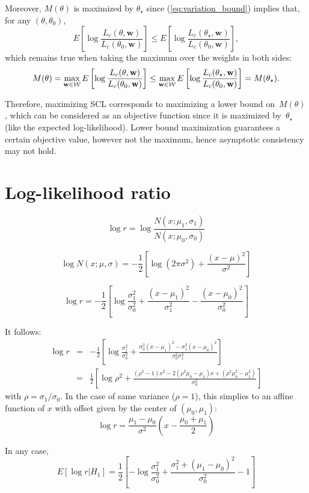 \documentclass[english]{scrartcl}
\begin{document}
Moreover, $M(\theta)$ is maximized by $\theta_\star$ since (\ref{eq:variation_bound}) implies that, for any $(\theta,\theta_0)$,
$$
E\left[ \log \frac{L_c(\theta, \mathbf{w})}{L_c(\theta_0, \mathbf{w})} \right]
\leq
E\left[ \log \frac{L_c(\theta_\star, \mathbf{w})}{L_c(\theta_0, \mathbf{w})} \right],
$$
which remains true when taking the maximum over the weights in both sides: 
$$
M(\theta) = 
\max_{\mathbf{w}\in{\cal W}} E\left[ \log \frac{L_c(\theta, \mathbf{w})}{L_c(\theta_0, \mathbf{w})} \right]
\leq
\max_{\mathbf{w}\in{\cal W}} E\left[ \log \frac{L_c(\theta_\star, \mathbf{w})}{L_c(\theta_0, \mathbf{w})} \right]
= M(\theta_\star)
.
$$

Therefore, maximizing SCL corresponds to maximizing a lower bound on~$M(\theta)$, which can be considered as an objective function since it is maximized by~$\theta_\star$ (like the expected log-likelihood). Lower bound maximization guarantees a certain objective value, however not the maximum, hence asymptotic consistency may not hold.

\section{Log-likelihood ratio}

$$
\log r = \log \frac{N(x;\mu_1,\sigma_1)}{N(x;\mu_0,\sigma_0)}
$$

$$
\log N(x;\mu,\sigma) = -\frac{1}{2}\left[
\log(2\pi\sigma^2) + \frac{(x-\mu)^2}{\sigma^2}
\right]
$$

$$
\log r = -\frac{1}{2}
\left[
\log \frac{\sigma_1^2}{\sigma_0^2}
+ \frac{(x-\mu_1)^2}{\sigma_1^2} - \frac{(x-\mu_0)^2}{\sigma_0^2}
\right]
$$

It follows:
\begin{eqnarray*}
\log r 
 & = & 
-\frac{1}{2}\left[
\log \frac{\sigma_1^2}{\sigma_0^2}
+ \frac{\sigma_0^2(x-\mu_1)^2 - \sigma_1^2(x-\mu_0)^2}{\sigma_0^2 \sigma_1^2}
\right] \\
 & = & 
\frac{1}{2}\left[
\log \rho^2
+ \frac{(\rho^2-1)x^2 - 2(\rho^2\mu_0-\mu_1)x+ (\rho^2\mu_0 ^2-\mu_1^2)}{\sigma_0^2}
\right]
\end{eqnarray*}
with $\rho=\sigma_1/\sigma_0$. In the case of same variance ($\rho=1$), this simplies to an affine function of $x$ with offset given by the center of $(\mu_0,\mu_1)$:
$$
\log r = \frac{\mu_1-\mu_0}{\sigma^2} \left(
x - \frac{\mu_0 + \mu_1}{2}
\right) 
$$

In any case,
$$
E[\log r | H_1] = 
\frac{1}{2}
\left[
- \log \frac{\sigma_1^2}{\sigma_0^2}
+ \frac{\sigma_1^2 + (\mu_1-\mu_0)^2}{\sigma_0^2}
- 1
\right]
$$
\end{document}
